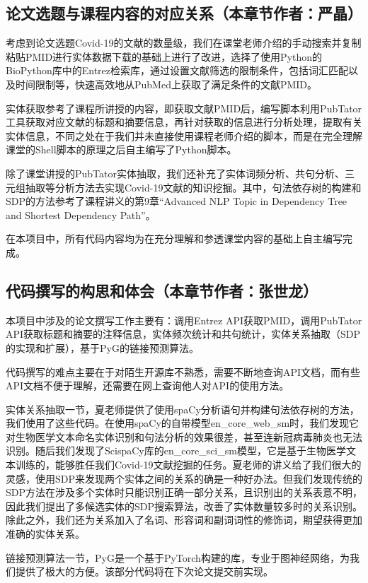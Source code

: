 \documentclass[twocolumn]{article}
\begin{document}
\subsection{论文选题与课程内容的对应关系（本章节作者：严晶）}
考虑到论文选题Covid-19的文献的数量级，我们在课堂老师介绍的手动搜索并复制粘贴PMID进行实体数据下载的基础上进行了改进，选择了使用Python的BioPython库中的Entrez检索库，通过设置文献筛选的限制条件，包括词汇匹配以及时间限制等，快速高效地从PubMed上获取了满足条件的文献PMID。\par
实体获取参考了课程所讲授的内容，即获取文献PMID后，编写脚本利用PubTator工具获取对应文献的标题和摘要信息，再针对获取的信息进行分析处理，提取有关实体信息，不同之处在于我们并未直接使用课程老师介绍的脚本，而是在完全理解课堂的Shell脚本的原理之后自主编写了Python脚本。\par
除了课堂讲授的PubTator实体抽取，我们还补充了实体词频分析、共句分析、三元组抽取等分析方法去实现Covid-19文献的知识挖掘。其中，句法依存树的构建和SDP的方法参考了课程讲义的第9章“Advanced NLP Topic in Dependency Tree and Shortest Dependency Path”。\par
在本项目中，所有代码内容均为在充分理解和参透课堂内容的基础上自主编写完成。\par

\subsection{代码撰写的构思和体会（本章节作者：张世龙）}
本项目中涉及的论文撰写工作主要有：调用Entrez API获取PMID，调用PubTator API获取标题和摘要的注释信息，实体频次统计和共句统计，实体关系抽取（SDP的实现和扩展），基于PyG的链接预测算法。\par
代码撰写的难点主要在于对陌生开源库不熟悉，需要不断地查询API文档，而有些API文档不便于理解，还需要在网上查询他人对API的使用方法。\par
实体关系抽取一节，夏老师提供了使用spaCy分析语句并构建句法依存树的方法，我们使用了这些代码。在使用spaCy的自带模型en\_core\_web\_sm时，我们发现它对生物医学文本命名实体识别和句法分析的效果很差，甚至连新冠病毒肺炎也无法识别。随后我们发现了ScispaCy库的en\_core\_sci\_sm模型，它是基于生物医学文本训练的，能够胜任我们Covid-19文献挖掘的任务。夏老师的讲义给了我们很大的灵感，使用SDP来发现两个实体之间的关系的确是一种好办法。但我们发现传统的SDP方法在涉及多个实体时只能识别正确一部分关系，且识别出的关系表意不明，因此我们提出了多候选实体的SDP搜索算法，改善了实体数量较多时的关系识别。除此之外，我们还为关系加入了名词、形容词和副词词性的修饰词，期望获得更加准确的实体关系。\par
链接预测算法一节，PyG是一个基于PyTorch构建的库，专业于图神经网络，为我们提供了极大的方便。该部分代码将在下次论文提交前实现。
\end{document}
